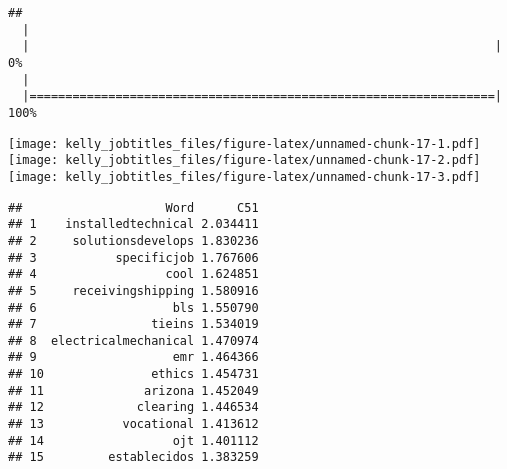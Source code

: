 \documentclass[]{article}
\newenvironment{Shaded}{\begin{snugshade}}{\end{snugshade}}
\newcommand{\KeywordTok}[1]{\textcolor[rgb]{0.13,0.29,0.53}{\textbf{{#1}}}}
\newcommand{\DataTypeTok}[1]{\textcolor[rgb]{0.13,0.29,0.53}{{#1}}}
\newcommand{\DecValTok}[1]{\textcolor[rgb]{0.00,0.00,0.81}{{#1}}}
\newcommand{\StringTok}[1]{\textcolor[rgb]{0.31,0.60,0.02}{{#1}}}
\newcommand{\NormalTok}[1]{{#1}}
\begin{document}
\begin{verbatim}
## 
  |                                                                       
  |                                                                 |   0%
  |                                                                       
  |=================================================================| 100%
\end{verbatim}

\begin{Shaded}
\end{Shaded}

\begin{Shaded}
\end{Shaded}

\texttt{[image: kelly\_jobtitles\_files/figure-latex/unnamed-chunk-17-1.pdf]}
\texttt{[image: kelly\_jobtitles\_files/figure-latex/unnamed-chunk-17-2.pdf]}
\texttt{[image: kelly\_jobtitles\_files/figure-latex/unnamed-chunk-17-3.pdf]}

\begin{Shaded}
\end{Shaded}

\begin{verbatim}
##                    Word      C51
## 1    installedtechnical 2.034411
## 2     solutionsdevelops 1.830236
## 3           specificjob 1.767606
## 4                  cool 1.624851
## 5     receivingshipping 1.580916
## 6                   bls 1.550790
## 7                tieins 1.534019
## 8  electricalmechanical 1.470974
## 9                   emr 1.464366
## 10               ethics 1.454731
## 11              arizona 1.452049
## 12             clearing 1.446534
## 13           vocational 1.413612
## 14                  ojt 1.401112
## 15         establecidos 1.383259
\end{verbatim}
\end{document}
